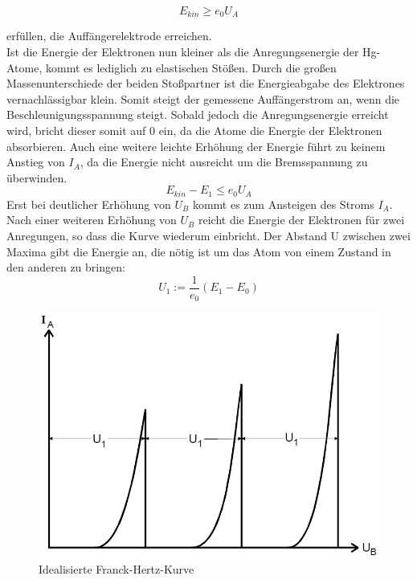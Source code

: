 \begin{equation}
E_{kin} \geq e_0 U_A
\end{equation}

erfüllen, die Auffängerelektrode erreichen.\\

Ist die Energie der Elektronen nun kleiner als die Anregungsenergie der Hg-Atome, kommt es lediglich zu elastischen Stößen. Durch die großen Massenunterschiede der beiden Stoßpartner ist die Energieabgabe des Elektrones vernachlässigbar klein. Somit steigt der gemessene Auffängerstrom an, wenn die Beschleunigungsspannung steigt. 
Sobald jedoch die Anregungsenergie erreicht wird, bricht dieser somit auf 0 ein, da die Atome die Energie der Elektronen absorbieren. Auch eine weitere leichte Erhöhung der Energie führt zu keinem Anstieg von $I_A$, da die Energie nicht ausreicht um die Bremsspannung zu überwinden.
\begin{equation*}
E_{kin} - E_1 \leq e_0 U_A
\end{equation*}
Erst bei deutlicher Erhöhung von $U_B$ kommt es zum Ansteigen des Stroms $I_A$.\\
Nach einer weiteren Erhöhung von $U_B$ reicht die Energie der Elektronen für zwei Anregungen, so dass die Kurve wiederum einbricht. Der Abstand U zwischen zwei Maxima gibt die Energie an, die nötig ist um das Atom von einem Zustand in den anderen zu bringen:
\begin{equation}
U_1 := \frac{1}{e_0}(E_1 - E_0)
\end{equation}

\begin{figure}[h]
	\centering
	\includegraphics[scale = 0.5]{Grafiken/V601_Abb2.jpg}
	\caption{Idealisierte Franck-Hertz-Kurve\cite{V601}}
\end{figure}
\newpage

